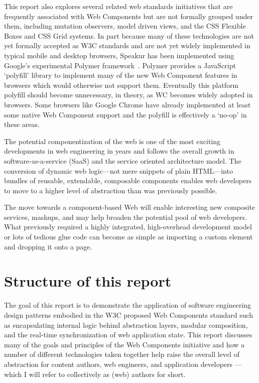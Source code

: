 This report also explores several related web standards initiatives that are frequently associated with Web Components 
but are not formally grouped under them, including mutation observers,
model driven views, 
and the CSS Flexible Boxes
and CSS Grid
systems. 
In part because many of these technologies are not yet formally accepted as W3C standards and are not yet widely implemented in typical mobile and desktop browsers, 
Speakur has been implemented using Google's experimental Polymer framework~\cite{polymercontributors2015}.
Polymer provides a JavaScript `polyfill'
library to implement many of the new Web Component features in browsers which would otherwise not support them. 
Eventually this platform polyfill should become unnecessary, in theory, as WC becomes widely adopted in browsers.
Some browsers like Google Chrome 
have already implemented at least some native 
Web Component support 
and the polyfill is effectively a `no-op' in these areas.

The potential componentization of the web is one of the most exciting developments in web engineering in years and follows the overall growth in software-as-a-service (SaaS) 
and the service oriented architecture
model. 
The conversion of dynamic web logic---not mere snippets of plain HTML---into bundles of reusable, extendable, composable components enables web developers to move to a higher level of abstraction than was previously possible.

The move towards a component-based Web will enable interesting new composite services, mashups, and may help broaden the potential pool of web developers. 
What previously required a highly integrated, high-overhead development model or lots of tedious glue code can become as simple as importing a custom element and dropping it onto a page.


\section{Structure of this report}
%

The goal of this report is to demonstrate the application of 
software engineering 
design patterns embodied in the W3C proposed Web Components standard such as 
encapsulating internal logic 
behind abstraction layers, 
modular composition, 
and the real-time synchronization of web application state. 
This report discusses many of the goals and principles of the Web Components initiative and how a number of different technologies taken together help raise the overall level of 
abstraction for content authors, web engineers, and application developers --- which I will refer to collectively as (web) authors for short.

